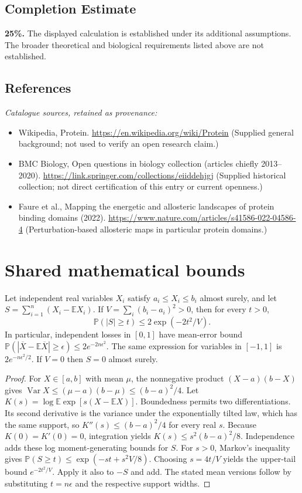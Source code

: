 \documentclass[11pt]{article}
\begin{document}
\subsection{Completion Estimate}
\textbf{25\%.} The displayed calculation is established under its additional assumptions. The broader theoretical and biological requirements listed above are not established.
\subsection{References}
\noindent\emph{Catalogue sources, retained as provenance:}
\begin{itemize}
\item Wikipedia, Protein. \url{https://en.wikipedia.org/wiki/Protein} (Supplied general background; not used to verify an open research claim.)
\item BMC Biology, Open questions in biology collection (articles chiefly 2013--2020). \url{https://link.springer.com/collections/eiiddehjgj} (Supplied historical collection; not direct certification of this entry or current openness.)
\item Faure et al., Mapping the energetic and allosteric landscapes of protein binding domains (2022). \url{https://www.nature.com/articles/s41586-022-04586-4} (Perturbation-based allosteric maps in particular protein domains.)
\end{itemize}




\section{Shared mathematical bounds}\label{app:bounds}
\begin{lemma}\label{lem:bounded}
Let independent real variables $X_i$ satisfy $a_i\leq X_i\leq b_i$ almost surely,
and let $S=\sum_{i=1}^n(X_i-\mathbb{E} X_i)$. If
$V=\sum_i(b_i-a_i)^2>0$, then for every $t>0$,
\[
 \mathbb{P}(|S|\geq t)\leq 2\exp(-2t^2/V).
\]
In particular, independent losses in $[0,1]$ have mean-error bound
$\mathbb{P}(|\overline X-\mathbb{E}\overline X|\geq\epsilon)
\leq2e^{-2n\epsilon^2}$. The same expression for variables in $[-1,1]$
is $2e^{-n\epsilon^2/2}$. If $V=0$ then $S=0$ almost surely.
\end{lemma}
\begin{proof}
For $X\in[a,b]$ with mean $\mu$, the nonnegative product
$(X-a)(b-X)$ gives
$\operatorname{Var} X\leq(\mu-a)(b-\mu)\leq(b-a)^2/4$.
Let $K(s)=\log\mathbb{E}\exp[s(X-\mathbb{E} X)]$.
Boundedness permits two differentiations. Its second derivative is the variance
under the exponentially tilted law, which has the same support, so
$K''(s)\leq(b-a)^2/4$ for every real $s$.
Because $K(0)=K'(0)=0$, integration yields
$K(s)\leq s^2(b-a)^2/8$.
Independence adds these log moment-generating bounds for $S$.
For $s>0$, Markov's inequality gives
$\mathbb{P}(S\geq t)\leq\exp(-st+s^2V/8)$.
Choosing $s=4t/V$ yields the upper-tail bound $e^{-2t^2/V}$.
Apply it also to $-S$ and add. The stated mean versions follow by substituting
$t=n\epsilon$ and the respective support widths.
\end{proof}
\end{document}
